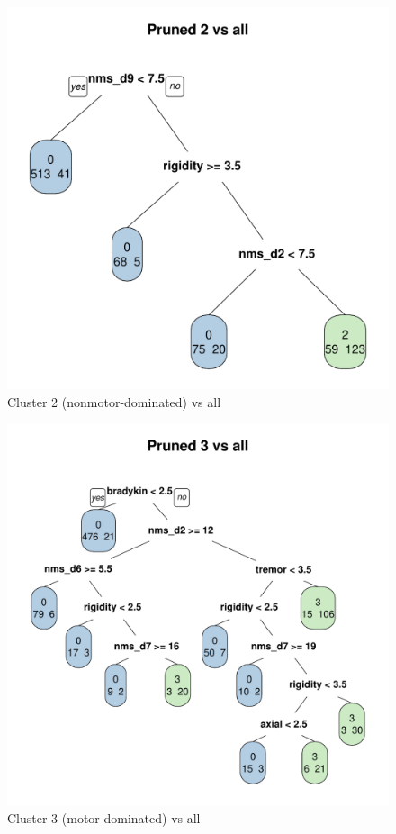 \documentclass[10pt]{article}
\begin{document}
\begin{multicols}{2}
\begin{figure}[H]
  \centering
  \includegraphics[width=0.75\linewidth]{dtree-2va-pruned.pdf}
  \caption{Cluster 2 (nonmotor-dominated) vs all}
  \label{fig:2va}
\end{figure}
\begin{figure}[H]
  \centering
  \includegraphics[width=0.75\linewidth]{dtree-3va-pruned.pdf}
  \caption{Cluster 3 (motor-dominated) vs all}
  \label{fig:3va}
\end{figure}
\begin{figure}[H]
  \centering

\end{figure}
\end{multicols}
\end{document}
